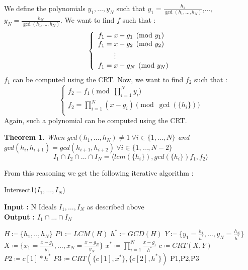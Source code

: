 \documentclass{article}
\newtheorem{theorem}{Theorem}[section]
\begin{document}
We define the polynomials $y_{1},\dots,y_{N}$ such that $y_{1} = \displaystyle \frac{h_{1}}{\gcd(h_{1},...,h_{N})}$,$\dots$, $y_{N} = \displaystyle \frac{h_{N}}{\gcd(h_{1},...,h_{N})}$. We want to find $f$ such that :
\begin{displaymath}
    \left\{
    \begin{array}{ll}
        f_{1} = x-g_{1} \pmod {y_{1}} \\
        f_{1} = x-g_{2} \pmod {y_{2}} \\
        \hspace{8mm} \vdots \\
        f_{1} = x-g_{N} \pmod{y_{N}}\\
    \end{array}
    \right.
\end{displaymath}
$f_{1}$ can be computed using the CRT. Now, we want to find $f_{2}$ such that : 
\begin{displaymath}
    \left\{
    \begin{array}{ll}
        f_{2} = f_{1} \pmod {\prod_{i=1}^{N} y_{i}} \\
        f_{2} = \prod^{N}_{i=1} (x-g_{i}) \pmod {\gcd(\{h_{i}\})} \\
    \end{array}
    \right.
\end{displaymath}
Again, such a polynomial can be computed using the CRT\@.

\begin{theorem}
    When $gcd(h_{1},...,h_{N})\neq1\ \forall i \in \{1,\dots,N\}$ and $gcd(h_{i},h_{i+1})=gcd(h_{i+1},h_{i+2})\ \forall i \in \{1,...,N-2\}$
    \begin{displaymath}
        I_{1} \cap I_{2} \cap \dots \cap I_{N} = \langle lcm(\{h_{i}\}), gcd(\{h_{i}\})f_{1},f_{2} \rangle
    \end{displaymath}
\end{theorem}

From this reasoning we get the following iterative algorithm : 

\begin{algorithm}
    \caption{Intersect1($I_{1},\dots,I_{N}$)}\label{alg:intersect-n-ideals-equal-gcd}
    \textbf{Input : } N Ideals $I_{1},\dots,I_{N}$ as described above \\
    \textbf{Output : }$I_{1} \cap \dots\cap I_ {N}$
\begin{algorithmic}
    \State $H \coloneqq \{h_{1},..,h_{N}\}$
    \State $P1 \coloneqq LCM(H)$
    \State $h^{*} \coloneqq GCD(H)$
    \State $Y\coloneqq \{y_{1}= \frac{h_{1}}{h^{*}},...,y_{N}= \frac{h_{N}}{h^{*}}\}$
    \State $X \coloneqq \{x_{1} = \frac{x-g_{1}}{y_{1}},...,x_{N} =\frac{x-g_{N}}{y_{N}}\}$
    \State $x^{*} \coloneqq \prod^{N}_{i=1} \frac{x-g_{i}}{h^{*}}$
    \State $c\coloneqq CRT(X,Y)$
    \State $P2 \coloneqq c[1]*h^{*}$ 
    \State $P3 \coloneqq CRT(\{c[1],x^{*}\},\{c[2], h^{*}\})$
    \State \Return P1,P2,P3
\end{algorithmic}
\end{algorithm}
\end{document}
